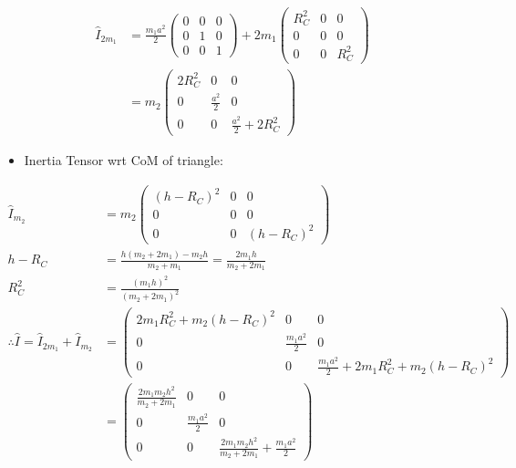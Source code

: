 \documentclass[a4paper,11pt,normalem]{article}
\begin{document}
\begin{example}[2]
\[
    \begin{aligned}
    \hat{I}_{2m_1} &= \frac{m_1 a^2}{2} \begin{pmatrix} 0 & 0 & 0 \\ 0 & 1 & 0 \\ 0 & 0 & 1 \end{pmatrix} + 2m_1 \begin{pmatrix} R_C^2 & 0 & 0 \\ 0 & 0 & 0 \\ 0 & 0 & R_C^2 \end{pmatrix} \\
    &= m_2 \begin{pmatrix} 2R_C^2 & 0 & 0 \\ 0 & \frac{a^2}{2} & 0 \\ 0 & 0 & \frac{a^2}{2} + 2R_C^2 \end{pmatrix}
    \end{aligned}
\]

\begin{itemize}
\item
  Inertia Tensor wrt CoM of triangle:
\end{itemize}

\[
    \begin{aligned}
    \hat{I}_{m_2} &= m_2 \begin{pmatrix} (h - R_C)^2 & 0 & 0 \\ 0 & 0 & 0 \\ 0 & 0 & (h - R_C)^2 \end{pmatrix} \\
    h - R_C &= \frac{h(m_2 + 2m_1) - m_2h}{m_2 + m_1} = \frac{2m_1 h}{m_2 + 2m_1} \\
    R_C^2 &= \frac{(m_1 h)^2}{(m_2 + 2m_1)^2} \\
    \therefore \hat{I} = \hat{I}_{2m_1} + \hat{I}_{m_2} &= \begin{pmatrix} 2m_1R_C^2 + m_2(h - R_C)^2 & 0 & 0 \\ 0 & \frac{m_1 a^2}{2} & 0 \\ 0 & 0 & \frac{m_1 a^2}{2} + 2m_1R_C^2 + m_2(h - R_C)^2 \end{pmatrix} \\
    &= \begin{pmatrix} \frac{2m_1m_2 h^2}{m_2 + 2m_1} & 0 & 0 \\ 0 & \frac{m_1 a^2}{2} & 0 \\ 0 & 0 & \frac{2m_1m_2 h^2}{m_2 + 2m_1} + \frac{m_1 a^2}{2} \end{pmatrix}
    \end{aligned}
\]
\end{example}
\end{document}
